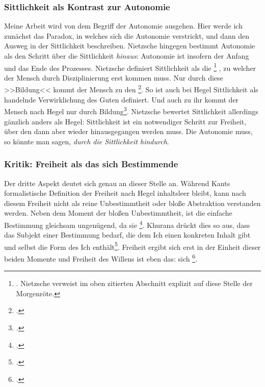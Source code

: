 \documentclass[12pt, a4paper, openany]{report}
\begin{document}
\subsubsection{Sittlichkeit als Kontrast zur Autonomie}
Meine Arbeit wird von dem Begriff der Autonomie ausgehen. 
Hier werde ich zunächst das Paradox, in welches sich die Autonomie verstrickt, und dann den Ausweg in der Sittlichkeit beschreiben.
Nietzsche hingegen bestimmt Autonomie als den Schritt über die Sittlichkeit \emph{hinaus}:
Autonomie ist insofern der Anfang und das Ende des Prozesses.
Nietzsche definiert Sittlichkeit als die %
\footnote{
    \cite[][22]{nietzsche_morgenrote_1999}. 
    Nietzsche verweist im oben zitierten Abschnitt explizit auf diese Stelle der Morgenröte.
}%
, zu welcher der Mensch durch Disziplinierung erst kommen muss.
Nur durch diese >>Bildung<< kommt der Mensch zu den \footcite[][297]{nietzsche_jenseits_2014}. 
So ist auch bei Hegel Sittlichkeit als handelnde Verwirklichung des Guten definiert.
Und auch zu ihr kommt der Mensch nach Hegel nur durch Bildung\footcite[Vergleiche dazu etwa:][§ 187 A, S. 191]{hegel_grundlinien_2017}.
Nietzsche bewertet Sittlichkeit allerdings gänzlich anders als Hegel:
Sittlichkeit ist ein notwendiger Schritt zur Freiheit, über den dann aber wieder hinausgegangen werden muss.
Die Autonomie muss, so könnte man sagen, \emph{durch die Sittlichkeit hindurch}.\\

\subsubsection{Kritik: Freiheit als das sich Bestimmende}
Der dritte Aspekt deutet sich genau an dieser Stelle an. 
Während Kants formalistische Definition der Freiheit nach Hegel inhaltsleer bleibt, kann nach diesem Freiheit nicht als reine Unbestimmtheit oder bloße Abstraktion verstanden werden.
Neben dem Moment der bloßen Unbestimmtheit, ist die einfache Bestimmung gleichsam ungenügend, da sie \footcite[][§ 6 A, S. 39]{hegel_grundlinien_2017}.
Khurana drückt dies so aus, dass das Subjekt einer Bestimmung bedarf, die dem Ich einen konkreten Inhalt gibt und selbst die Form des Ich enthält\footcite[Vgl.][285]{khurana_freiheit_2017}. 
Freiheit ergibt sich erst in der Einheit dieser beiden Momente und Freiheit des Willens ist eben das: sich \footcite[][§ 7, S. 40]{hegel_grundlinien_2017}.\\
\end{document}
